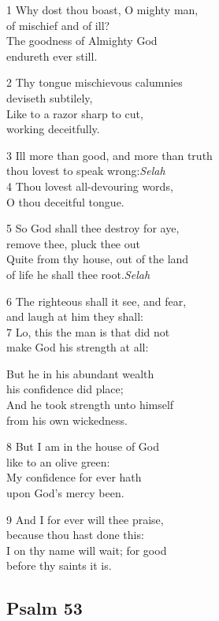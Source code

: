 1 Why dost thou boast, O mighty man,\\
of mischief and of ill?\\
The goodness of Almighty God\\
endureth ever still.

2 Thy tongue mischievous calumnies\\
deviseth subtilely,\\
Like to a razor sharp to cut,\\
working deceitfully.

3 Ill more than good, and more than truth\\
thou lovest to speak wrong:\hfill \emph{Selah}\\
4 Thou lovest all-devouring words,\\
O thou deceitful tongue.

5 So God shall thee destroy for aye,\\
remove thee, pluck thee out\\
Quite from thy house, out of the land\\
of life he shall thee root.\hfill\emph{Selah}

6 The righteous shall it see, and fear,\\
and laugh at him they shall:\\
7 Lo, this the man is that did not\\
make God his strength at all:

But he in his abundant wealth\\
his confidence did place;\\
And he took strength unto himself\\
from his own wickedness.

8 But I am in the house of God\\
like to an olive green:\\
My confidence for ever hath\\
upon God’s mercy been.

9 And I for ever will thee praise,\\
because thou hast done this:\\
I on thy name will wait; for good\\
before thy saints it is.

\begin{center}
\quad{}\quad{}
\end{center}

\subsection*{Psalm 53}

